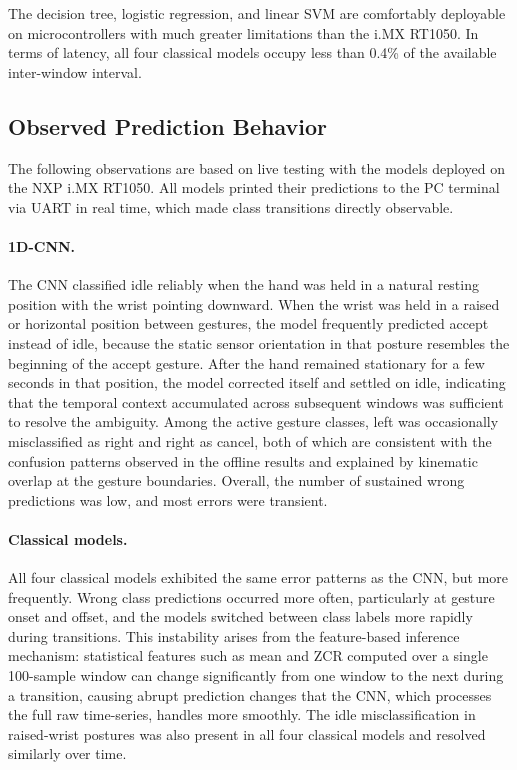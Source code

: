 The decision tree, logistic regression, and linear SVM are comfortably deployable on microcontrollers with much greater limitations than the i.MX RT1050. In terms of latency, all four classical models occupy less than 0.4\% of the available inter-window interval.

\subsection{Observed Prediction Behavior}

The following observations are based on live testing with the models deployed on the NXP i.MX RT1050. All models printed their predictions to the PC terminal via UART in real time, which made class transitions directly observable.
 
\paragraph{1D-CNN.}
The CNN classified idle reliably when the hand was held in a natural resting position with the wrist pointing downward. When the wrist was held in a raised or horizontal position between gestures, the model frequently predicted accept instead of idle, because the static sensor orientation in that posture resembles the beginning of the accept gesture. After the hand remained stationary for a few seconds in that position, the model corrected itself and settled on idle, indicating that the temporal context accumulated across subsequent windows was sufficient to resolve the ambiguity. Among the active gesture classes, left was occasionally misclassified as right and right as cancel, both of which are consistent with the confusion patterns observed in the offline results and explained by kinematic overlap at the gesture boundaries. Overall, the number of sustained wrong predictions was low, and most errors were transient.
 
\paragraph{Classical models.}
All four classical models exhibited the same error patterns as the CNN, but more frequently. Wrong class predictions occurred more often, particularly at gesture onset and offset, and the models switched between class labels more rapidly during transitions. This instability arises from the feature-based inference mechanism: statistical features such as mean and ZCR computed over a single 100-sample window can change significantly from one window to the next during a transition, causing abrupt prediction changes that the CNN, which processes the full raw time-series, handles more smoothly. The idle misclassification in raised-wrist postures was also present in all four classical models and resolved similarly over time.
 
